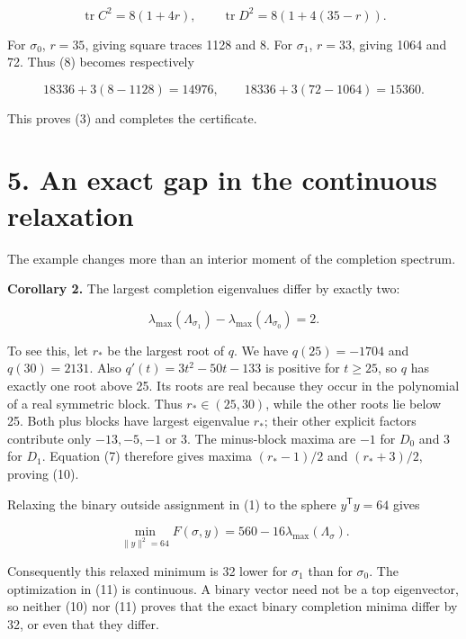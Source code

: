 \documentclass[11pt,letterpaper]{article}
\begin{document}
\[\operatorname{tr}C^2=8(1+4r),\qquad
\operatorname{tr}D^2=8(1+4(35-r)).
\tag{9}\]

For \(\sigma_0\), \(r=35\), giving square traces 1128 and 8. For \(\sigma_1\), \(r=33\), giving 1064 and 72. Thus (8) becomes respectively

\[18336+3(8-1128)=14976,
\qquad
18336+3(72-1064)=15360.\]

This proves (3) and completes the certificate.

\section{5. An exact gap in the continuous relaxation}\label{an-exact-gap-in-the-continuous-relaxation}

The example changes more than an interior moment of the completion spectrum.

\textbf{Corollary 2.} The largest completion eigenvalues differ by exactly two:

\[\lambda_{\max}(\Lambda_{\sigma_1})
-\lambda_{\max}(\Lambda_{\sigma_0})=2.
\tag{10}\]

To see this, let \(r_*\) be the largest root of \(q\). We have \(q(25)=-1704\) and \(q(30)=2131\). Also \(q'(t)=3t^2-50t-133\) is positive for \(t\ge25\), so \(q\) has exactly one root above 25. Its roots are real because they occur in the polynomial of a real symmetric block. Thus \(r_*\in(25,30)\), while the other roots lie below 25. Both plus blocks have largest eigenvalue \(r_*\); their other explicit factors contribute only \(-13,-5,-1\) or \(3\). The minus-block maxima are \(-1\) for \(D_0\) and \(3\) for \(D_1\). Equation (7) therefore gives maxima \((r_*-1)/2\) and \((r_*+3)/2\), proving (10).

Relaxing the binary outside assignment in (1) to the sphere \(y^{\mathsf T}y=64\) gives

\[\min_{\|y\|^2=64}F(\sigma,y)
=560-16\lambda_{\max}(\Lambda_\sigma).
\tag{11}\]

Consequently this relaxed minimum is 32 lower for \(\sigma_1\) than for \(\sigma_0\). The optimization in (11) is continuous. A binary vector need not be a top eigenvector, so neither (10) nor (11) proves that the exact binary completion minima differ by 32, or even that they differ.
\end{document}
